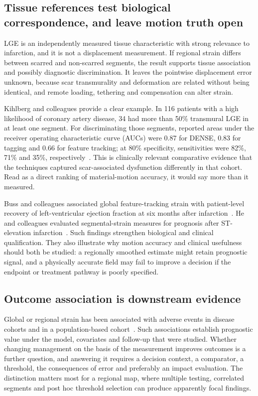 \subsection{Tissue references test biological correspondence, and leave motion truth open}

LGE is an independently measured tissue characteristic with strong relevance to infarction, and it is not a displacement measurement. If regional strain differs between scarred and non-scarred segments, the result supports tissue association and possibly diagnostic discrimination. It leaves the pointwise displacement error unknown, because scar transmurality and deformation are related without being identical, and remote loading, tethering and compensation can alter strain.

Kihlberg and colleagues provide a clear example. In 116 patients with a high likelihood of coronary artery disease, 34 had more than 50\% transmural LGE in at least one segment. For discriminating those segments, reported areas under the receiver operating characteristic curve (AUCs) were 0.87 for DENSE, 0.83 for tagging and 0.66 for feature tracking; at 80\% specificity, sensitivities were 82\%, 71\% and 35\%, respectively~\cite{kihlberg2020clinical}. This is clinically relevant comparative evidence that the techniques captured scar-associated dysfunction differently in that cohort. Read as a direct ranking of material-motion accuracy, it would say more than it measured.

Buss and colleagues associated global feature-tracking strain with patient-level recovery of left-ventricular ejection fraction at six months after infarction~\cite{buss2015}. He and colleagues evaluated segmental-strain measures for prognosis after ST-elevation infarction~\cite{he2024}. Such findings strengthen biological and clinical qualification. They also illustrate why motion accuracy and clinical usefulness should both be studied: a regionally smoothed estimate might retain prognostic signal, and a physically accurate field may fail to improve a decision if the endpoint or treatment pathway is poorly specified.

\subsection{Outcome association is downstream evidence}

Global or regional strain has been associated with adverse events in disease cohorts and in a population-based cohort~\cite{mangion2019,chadalavada2024}. Such associations establish prognostic value under the model, covariates and follow-up that were studied. Whether changing management on the basis of the measurement improves outcomes is a further question, and answering it requires a decision context, a comparator, a threshold, the consequences of error and preferably an impact evaluation. The distinction matters most for a regional map, where multiple testing, correlated segments and post hoc threshold selection can produce apparently focal findings.

